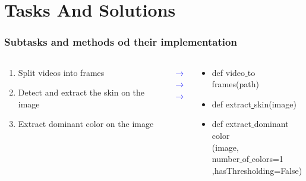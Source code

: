 \documentclass[10pt,pdf]{beamer}
\begin{document}
\section{Tasks And Solutions}
\begin{frame}
\frametitle{Subtasks and methods od their implementation}
\begin{columns}[T,onlytextwidth]
    \begin{column}{0.3\textwidth}
        \begin{enumerate}
        \item Split videos into frames 
        \item Detect and extract the skin on the image
        \item Extract dominant color on the image 
        \end{enumerate}
    \end{column}
    \begin{column}{0.1\textwidth}
    \bigskip    
    \LARGE
    \textcolor{blue}{$\rightarrow$\\}
    \vspace{0.5cm}
    \textcolor{blue}{$\rightarrow$\\}
    \vspace{0.6cm}
    \textcolor{blue}{$\rightarrow$\\}
    \normalsize
    \end{column}
    \begin{column}{0.4\textwidth}
    \begin{itemize}
        \item def video\underline{ }to\underline{ }frames(path)
        \vspace{0.1cm}
        \item def extract\underline{ }skin(image)
        \vspace{0.4cm}
        \item def extract\underline{ }dominant\underline{ }color\\(image,\\number\underline{ }of\underline{ }colors=1\\,hasThresholding=False)
    \end{itemize}
    \end{column}
\end{columns}
\end{frame}
\end{document}
